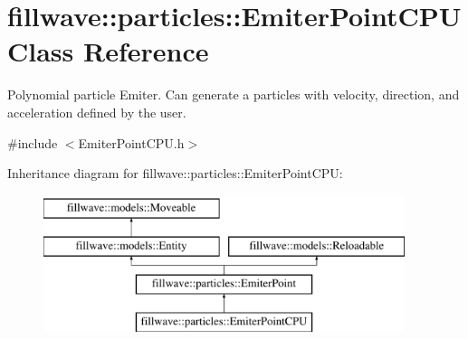 \hypertarget{classfillwave_1_1particles_1_1EmiterPointCPU}{}\section{fillwave\+:\+:particles\+:\+:Emiter\+Point\+C\+P\+U Class Reference}
\label{classfillwave_1_1particles_1_1EmiterPointCPU}


Polynomial particle Emiter. Can generate a particles with velocity, direction, and acceleration defined by the user.  




{\ttfamily \#include $<$Emiter\+Point\+C\+P\+U.\+h$>$}

Inheritance diagram for fillwave\+:\+:particles\+:\+:Emiter\+Point\+C\+P\+U\+:\begin{figure}[H]
\begin{center}
\leavevmode
\includegraphics[height=4.000000cm]{classfillwave_1_1particles_1_1EmiterPointCPU}
\end{center}
\end{figure}
